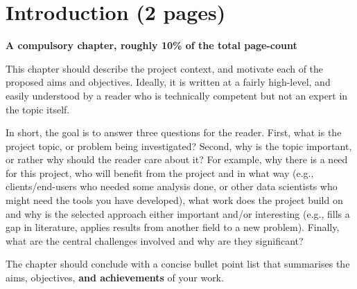 \documentclass{dissertation}
\begin{document}
%

\mainmatter


\chapter{Introduction (2 pages)}
\label{chap:introduction}

{\bf A compulsory chapter, roughly 10\% of the total page-count}
\vspace{1cm} 

\noindent
This chapter should describe the project context, and motivate each of
the proposed aims and objectives.  Ideally, it is written at a fairly 
high-level, and easily understood by a reader who is technically 
competent but not an expert in the topic itself.

In short, the goal is to answer three questions for the reader.  First, 
what is the project topic, or problem being investigated?  Second, why 
is the topic important, or rather why should the reader care about it?  
For example, why there is a need for this project, who will benefit from the 
project and in what way (e.g., clients/end-users who needed some analysis
done, or other data scientists who might need the tools you have developed), what 
work does the project build on and why is the selected approach either
important and/or interesting (e.g., fills a gap in literature, applies
results from another field to a new problem).  Finally, what are the 
central challenges involved and why are they significant? 
 
The chapter should conclude with a concise bullet point list that 
summarises the aims, objectives, {\bf and achievements}\/ of your work. 

\end{document}
